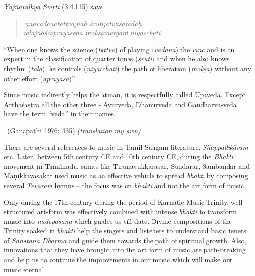 \textit{Yājñavalkya Smṛti} (3.4.115) says

\begin{verse}
\textit{vīṇāvādanatattvajñaḥ śrutijātiviśāradaḥ} \\ \textit{tālajñaścāprayāsena mokṣamārgaṁ niyacchati} 
\end{verse}

“When one knows the science (\textit{tattva}) of playing (\textit{vādana}) the \textit{vīṇā} and is an expert in the classification of quarter tones (\textit{śruti}) and when he also knows rhythm (\textit{tāla}), he controls (\textit{niyacchati}) the path of liberation (\textit{mokṣa}) without any other effort (\textit{aprayāsa})”.

\begin{myquote}
Since music indirectly helps the ātman, it is respectfully called Upaveda. Except Arthaśāstra all the other three - Āyurveda, Dhanurveda and Gāndharva-veda have the term “veda” in their names. 

~\hfill (Ganapathi 1976: 435) \textit{(translation my own)}
\end{myquote}

There are several references to music in Tamil Sangam literature, \textit{Silappadikāram} etc. Later, between 5th century CE and 10th century CE, during the \textit{Bhakti} movement in Tamilnadu, saints like Tirunāvukkarasar, Sundarar, Sambandar and Māṇikkavāsakar used music as an effective vehicle to spread \textit{bhakti} by composing several \textit{Tevāram} hymns – the focus was on \textit{bhakti} and not the art form of music.

Only during the 17th century during the period of Karnatic Music Trinity, well-structured art-form was effectively combined with intense \textit{bhakti} to transform music into \textit{nādopāsanā} which guides us till date. Divine compositions of the Trinity soaked in \textit{bhakti} help the singers and listeners to understand basic tenets of \textit{Sanātana Dharma} and guide them towards the path of spiritual growth. Also, innovations that they have brought into the art form of music are path-breaking and help us to continue the improvements in our music which will make our music eternal.

